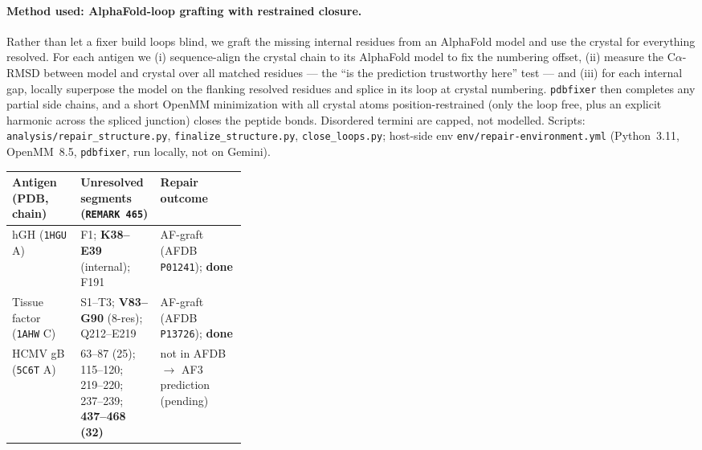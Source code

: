 \paragraph{Method used: AlphaFold-loop grafting with restrained closure.} Rather than let a
fixer build loops blind, we graft the missing internal residues from an AlphaFold model and use
the crystal for everything resolved. For each antigen we (i) sequence-align the crystal chain to
its AlphaFold model to fix the numbering offset, (ii) measure the C$\alpha$-RMSD between model and
crystal over all matched residues --- the ``is the prediction trustworthy here'' test --- and
(iii) for each internal gap, locally superpose the model on the flanking resolved residues and
splice in its loop at crystal numbering. \texttt{pdbfixer} then completes any partial side chains,
and a short OpenMM minimization with all crystal atoms position-restrained (only the loop free,
plus an explicit harmonic across the spliced junction) closes the peptide bonds. Disordered termini
are capped, not modelled. Scripts: \texttt{analysis/repair\_structure.py},
\texttt{finalize\_structure.py}, \texttt{close\_loops.py}; host-side env
\texttt{env/repair-environment.yml} (Python~3.11, OpenMM~8.5, \texttt{pdbfixer}, run locally, not on
Gemini).

\begin{center}\small
\begin{tabular}{@{}l p{0.34\linewidth} l@{}}
\toprule
Antigen (PDB, chain) & Unresolved segments (\texttt{REMARK 465}) & Repair outcome \\
\midrule
hGH (\texttt{1HGU} A) & F1; \textbf{K38--E39} (internal); F191 & AF-graft (AFDB \texttt{P01241}); \textbf{done} \\
Tissue factor (\texttt{1AHW} C) & S1--T3; \textbf{V83--G90} (8-res); Q212--E219 & AF-graft (AFDB \texttt{P13726}); \textbf{done} \\
HCMV gB (\texttt{5C6T} A) & 63--87 (25); 115--120; 219--220; 237--239; \textbf{437--468 (32)} & not in AFDB $\to$ AF3 prediction (pending) \\
\bottomrule
\end{tabular}
\end{center}

